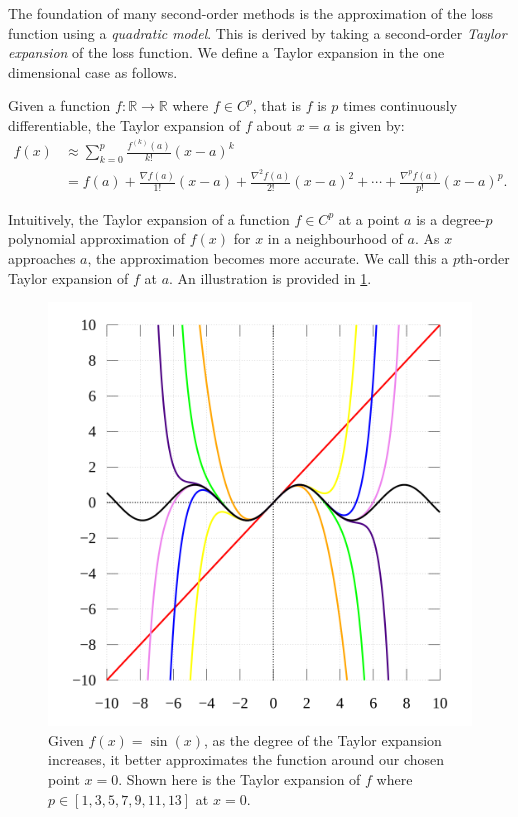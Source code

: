 The foundation of many second-order methods is the approximation of the loss function using a \textit{quadratic model}. This is derived by taking a second-order \textit{Taylor expansion} of the loss function. We define a Taylor expansion in the one dimensional case as follows.
\begin{definition}
    Given a function $f: \mathbb{R} \to \mathbb{R}$ where $f \in C^p$, that is $f$ is $p$ times continuously differentiable, the Taylor expansion of $f$ about $x = a$ is given by:
    \begin{align}
        f(x) 
        &\approx \sum_{k=0}^{p} \frac{f^{(k)}(a)}{k!} (x-a)^k \\
        &= f(a) + \frac{\nabla f(a)}{1!} (x-a) + \frac{\nabla^2 f(a)}{2!} (x-a)^2 + \cdots + \frac{\nabla^p f(a)}{p!} (x-a)^p.
    \end{align}
\end{definition}
Intuitively, the Taylor expansion of a function $f \in C^p$ at a point $a$ is a degree-$p$ polynomial approximation of $f(x)$ for $x$ in a neighbourhood of $a$. As $x$ approaches $a$, the approximation becomes more accurate. We call this a $p$th-order Taylor expansion of $f$ at $a$. An illustration is provided in \cref{fig:taylor_expansion}.

\begin{figure}[h]
    \centering
    \includegraphics[width=0.5\linewidth]{figures/2background/taylor_exp.png}
    \caption{Given $f(x) = \sin(x)$, as the degree of the Taylor expansion increases, it better approximates the function around our chosen point $x=0$. Shown here is the Taylor expansion of $f$ where $p \in [1,3,5,7,9,11,13]$ at $x=0$.}
    \label{fig:taylor_expansion}
\end{figure}

